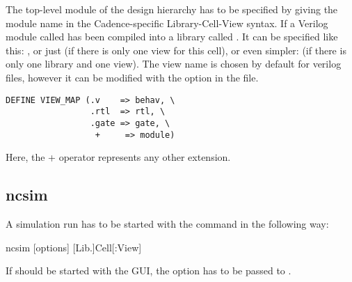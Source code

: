 The top-level module of the design hierarchy has to be specified by giving the
module name in the Cadence-specific Library-Cell-View syntax. If a Verilog
module called  has been compiled into a library called .
It can be specified like this: , or just
 (if there is only one view for this cell), or even simpler:
 (if there is only one library and one view).
The view name  is chosen by default for verilog files, however it
can be modified with the  option in the  file.
\begin{verbatim}
DEFINE VIEW_MAP (.v    => behav, \
                 .rtl  => rtl, \
                 .gate => gate, \
                  +     => module)
\end{verbatim}
Here, the + operator represents any other extension.

\subsection{ncsim}

A simulation run has to be started with the  command in the following
way:
\begin{lstbashplain}
 ncsim [options] [Lib.]Cell[:View]
\end{lstbashplain}

If  should be started with the  GUI, the option
\tf{-gui} has to be passed to .

